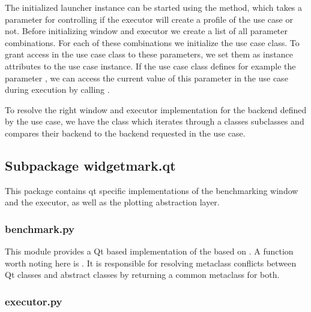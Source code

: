 

The initialized launcher instance can be started using the
 method, which takes a parameter
 for controlling if the executor will create a
profile of the use case or not. Before initializing window and executor we
create a list of all parameter combinations. For each of these 
combinations we initialize the use case class. To grant access in the use case
class to these parameters, we set them as instance attributes to the 
use case instance. If the use case class defines for example the parameter
, we can access the current value of this
parameter in the use case during execution by calling 
.



To resolve the right window and executor implementation for the backend defined
by the use case, we have the class  which
iterates through a classes subclasses and compares their backend to the backend
requested in the use case.

\subsection{Subpackage widgetmark.qt}

This package contains qt specific implementations of the benchmarking window and
the executor, as well as the plotting abstraction layer.

\subsubsection*{benchmark.py}

This module provides a Qt based implementation of the
 based on 
. A function worth noting here is
. It is responsible for resolving
metaclass conflicts between Qt classes and abstract classes by returning a
common metaclass for both.



\subsubsection*{executor.py}

